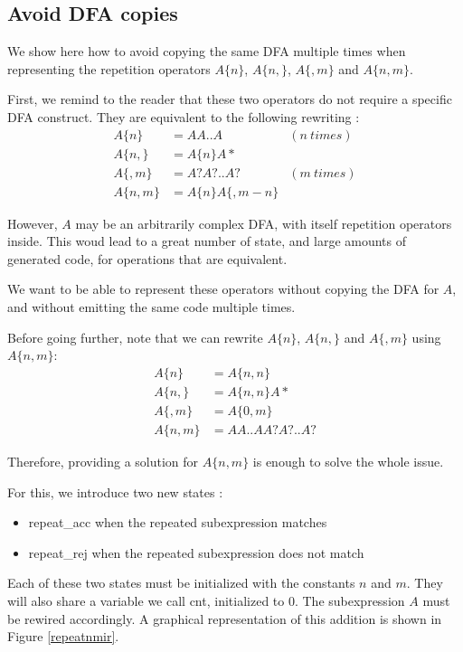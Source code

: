\documentclass[11pt,a4paper]{report}
\newcommand{\regexp}[1]{$#1$}
\newcommand{\haskell}[1]{\textsf{#1}}
\begin{document}
\subsection{Avoid DFA copies}

We show here how to avoid copying the same DFA multiple times when representing the repetition operators \regexp{A\{n\}}, \regexp{A\{n,\}}, \regexp{A\{,m\}} and \regexp{A\{n,m\}}.

First, we remind to the reader that these two operators do not require a specific DFA construct. They are equivalent to the following rewriting :
\begin{align*}
A\{n\} &= AA..A &(n\ times) \\
A\{n,\} &= A\{n\}A*  \\
A\{,m\} &= A?A?..A? &(m\ times) \\
A\{n,m\} &= A\{n\}A\{,m-n\}
\end{align*}

However, $A$ may be an arbitrarily complex DFA, with itself repetition operators inside. This woud lead to a great number of state, and large amounts of generated code, for operations that are equivalent.

We want to be able to represent these operators without copying the DFA for $A$, and without emitting the same code multiple times.

Before going further, note that we can rewrite \regexp{A\{n\}}, \regexp{A\{n,\}}  and \regexp{A\{,m\}}  using \regexp{A\{n,m\}}:
\begin{align*}
A\{n\} &= A\{n,n\} \\
A\{n,\} &= A\{n,n\}A* \\
A\{,m\} &= A\{0,m\} \\
A\{n,m\} &= AA..AA?A?..A?
\end{align*}

Therefore, providing a solution for \regexp{A\{n,m\}} is enough to solve the whole issue.

For this, we introduce two new states :
\begin{itemize}
\item \haskell{repeat\_acc} when the repeated subexpression matches
\item \haskell{repeat\_rej} when the repeated subexpression does not match
\end{itemize}

Each of these two states must be initialized with the constants $n$ and $m$. They will also share a variable we call \haskell{cnt}, initialized to $0$. The subexpression $A$ must be rewired accordingly. A graphical representation of this addition is shown in Figure \ref{repeatnmir}.
\end{document}
